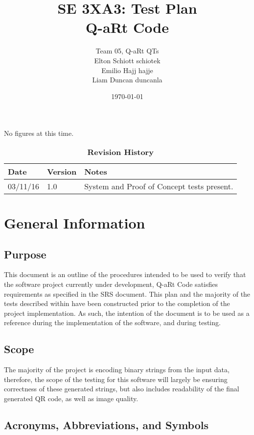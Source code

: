\documentclass[12pt, titlepage]{article}
\title{SE 3XA3: Test Plan\\Q-aRt Code}
\author{Team 05, Q-aRt QTs
		\\ Elton Schiott schiotek
		\\ Emilio Hajj hajje
		\\ Liam Duncan duncanla
}
\date{\today}
\begin{document}
\maketitle

\tableofcontents
\listoftables
\listoffigures

No figures at this time.

\begin{table}[bp]
\caption{\bf Revision History}
\begin{tabularx}{\textwidth}{p{3cm}p{2cm}X}
\toprule {\bf Date} & {\bf Version} & {\bf Notes}\\
\midrule
03/11/16 & 1.0 & System and Proof of Concept tests present.\\
\bottomrule
\end{tabularx}
\end{table}

\newpage


\section{General Information}

\subsection{Purpose}
	This document is an outline of the procedures intended to be used to verify 
	that the software project currently under development, Q-aRt Code satisfies 
	requirements as specified in the SRS document. This plan and the majority 
	of the tests described within have been constructed prior to the completion 
	of the project implementation. As such, the intention of the document is to 
	be used as a reference during the implementation of the software, and 
	during testing.
\subsection{Scope}
	The majority of the project is encoding binary strings from the input data, 
	therefore, the scope of the testing for this software will largely be 
	ensuring correctness of these generated strings, but also includes 
	readability of the final generated QR code, as well as image quality.
\subsection{Acronyms, Abbreviations, and Symbols}
	
\end{document}
